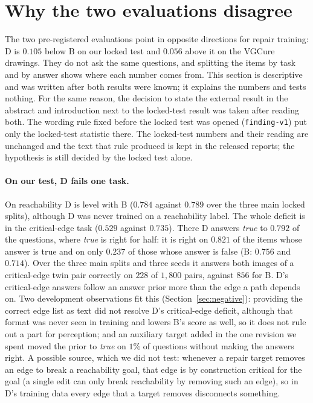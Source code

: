 \section{Why the two evaluations disagree}
\label{sec:why}

The two pre-registered evaluations point in opposite directions for repair training: D is
$0.105$ below B on our locked test and $0.056$ above it on the VGCure drawings. They do not ask
the same questions, and splitting the items by task and by answer shows where each number comes
from. This section is descriptive and was written after both results were known; it explains the
numbers and tests nothing. For the same reason, the decision to state the external result in the
abstract and introduction next to the locked-test result was taken after reading both. The wording
rule fixed before the locked test was opened (\texttt{finding-v1}) put only the locked-test statistic
there. The locked-test numbers and their reading are unchanged and the text that rule produced is
kept in the released reports; the hypothesis is still decided by the locked test alone.

\paragraph{On our test, D fails one task.}
On reachability D is level with B ($0.784$ against $0.789$ over the three main locked splits),
although D was never trained on a reachability label. The whole deficit is in the critical-edge
task ($0.529$ against $0.735$). There D answers \emph{true} to $0.792$ of the questions, where
\emph{true} is right for half: it is right on $0.821$ of the items whose answer is true and on
only $0.237$ of those whose answer is false (B: $0.756$ and $0.714$). Over the three main splits
and three seeds it answers both images of a critical-edge twin pair correctly on $228$ of $1{,}800$
pairs, against $856$ for B. D's critical-edge answers follow an answer prior more than the edge a
path depends on. Two development observations fit this (Section~\ref{sec:negative}): providing
the correct edge list as text did not resolve D's critical-edge deficit, although that format was
never seen in training and lowers B's score as well, so it does not rule out a part for perception;
and an auxiliary target added in the one revision we spent moved the prior to \emph{true} on $1\%$
of questions without making the answers right. A possible source, which we did not test: whenever a
repair target removes an edge to break a reachability goal, that edge is by construction critical
for the goal (a single edit can only break reachability by removing such an edge), so in D's
training data every edge that a target removes disconnects something.

